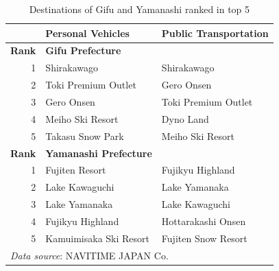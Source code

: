 \documentclass[10pt, conference, compsocconf]{IEEEtran}
\begin{document}
 \begin{table}[!h]\caption{Destinations of Gifu and Yamanashi ranked in top 5}
\label{dest}
\centering
\begin{tabular}{rll}
\hline
 & \bf Personal Vehicles& \bf Public Transportation \\ \hline
\bf Rank & \bf Gifu Prefecture \\\hline
1 & Shirakawago & Shirakawago \\
2 & Toki Premium Outlet & Gero Onsen \\
3 & Gero Onsen & Toki Premium Outlet \\
4 & Meiho Ski Resort & Dyno Land \\
5 & ​​Takasu Snow Park & ​​Meiho Ski Resort \\ \hline
\bf  Rank & \bf Yamanashi Prefecture \\\hline
1 & Fujiten Resort & Fujikyu Highland \\
2 & Lake Kawaguchi & Lake Yamanaka \\
3 & Lake Yamanaka & Lake Kawaguchi \\
4 & Fujikyu Highland & Hottarakashi Onsen\\
5 & ​​Kamuimisaka Ski Resort & Fujiten Snow Resort \\
\hline
\multicolumn{3}{l}{{\it Data source}: NAVITIME JAPAN Co.}
\end{tabular}
\end{table}
\end{document}
